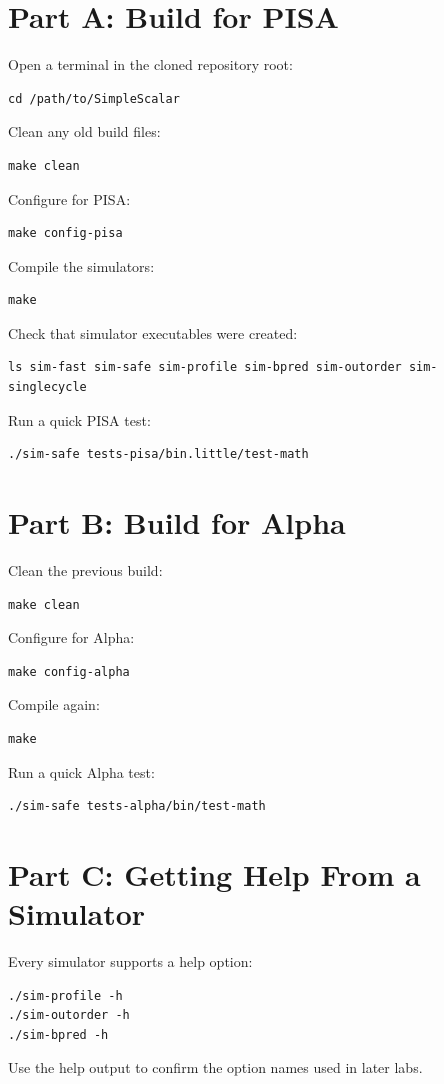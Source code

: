 \documentclass[11pt]{article}
\begin{document}
\section{Part A: Build for PISA}
Open a terminal in the cloned repository root:
\begin{lstlisting}
cd /path/to/SimpleScalar
\end{lstlisting}
Clean any old build files:
\begin{lstlisting}
make clean
\end{lstlisting}
Configure for PISA:
\begin{lstlisting}
make config-pisa
\end{lstlisting}
Compile the simulators:
\begin{lstlisting}
make
\end{lstlisting}
Check that simulator executables were created:
\begin{lstlisting}
ls sim-fast sim-safe sim-profile sim-bpred sim-outorder sim-singlecycle
\end{lstlisting}
Run a quick PISA test:
\begin{lstlisting}
./sim-safe tests-pisa/bin.little/test-math
\end{lstlisting}
\section{Part B: Build for Alpha}
Clean the previous build:
\begin{lstlisting}
make clean
\end{lstlisting}
Configure for Alpha:
\begin{lstlisting}
make config-alpha
\end{lstlisting}
Compile again:
\begin{lstlisting}
make
\end{lstlisting}
Run a quick Alpha test:
\begin{lstlisting}
./sim-safe tests-alpha/bin/test-math
\end{lstlisting}
\section{Part C: Getting Help From a Simulator}
Every simulator supports a help option:
\begin{lstlisting}
./sim-profile -h
./sim-outorder -h
./sim-bpred -h
\end{lstlisting}
Use the help output to confirm the option names used in later labs.
\end{document}
